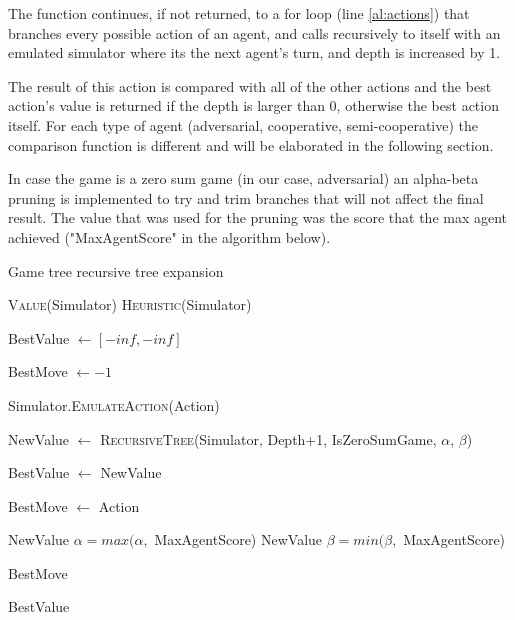 \documentclass{article}                     %
\begin{document}
	The function continues, if not returned, to a for loop (line \ref{al:actions}) that branches every possible action of an agent, and calls recursively to itself with an emulated simulator where its the next agent's turn, and depth is increased by 1. 
	
	The result of this action is compared with all of the other actions and the best action's value is returned if the depth is larger than 0, otherwise the best action itself.
	For each type of agent (adversarial, cooperative, semi-cooperative) the comparison function is different and will be elaborated in the following section.
	
	In case the game is a zero sum game (in our case, adversarial) an alpha-beta pruning is implemented to try and trim branches that will not affect the final result. The value that was used for the pruning was the score that the max agent achieved ("MaxAgentScore" in the algorithm below).
	
	\begin{algorithm}[H]
		\caption{Game tree recursive tree expansion}
		\label{alg:recursive}
		\begin{algorithmic}[1]
			\State \Return \textsc{Value}(Simulator)
			\EndIf
			\State \Return \textsc{Heuristic}(Simulator) \label{al:h}
			\EndIf
			
			\State BestValue $\longleftarrow  [-inf, -inf] $
			
			\State BestMove  $\longleftarrow -1 $
			
			\label{al:actions}
			
			\State Simulator.\textsc{EmulateAction}(Action)
			
			\State NewValue $ \leftarrow $ \textsc{RecursiveTree}(Simulator, Depth+1, IsZeroSumGame, $\alpha$, $\beta$)
			
			 \label{al:is_better}
			
			\State BestValue $ \longleftarrow $ NewValue
			
			\State BestMove $ \longleftarrow $ Action
			\EndIf
			
			 \label{al:alphabeta}
			\State \Return NewValue
			\EndIf
			\State $\alpha = max(\alpha,$ MaxAgentScore)
			\Else
			\State \Return NewValue
			\EndIf
			\State $\beta = min(\beta,$ MaxAgentScore)
			
			\EndIf
			
			
			\EndIf
			
			\EndFor
			
			
			\Return BestMove
			
			\Else
			
			\Return BestValue
			
			\EndIf
			\EndProcedure
		\end{algorithmic}
		
	\end{algorithm}
	
\end{document}
